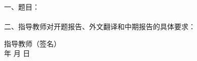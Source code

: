 
\newpage
\thispagestyle{empty}
{
\songti\sihao\bfseries
\begin{tabbing}
  \hspace{5mm} 一、题目：\underline{\makebox[12cm]{\zjutitlec}} \\
  \\
  \hspace{5mm} 二、指导教师对开题报告、外文翻译和中期报告的具体要求：
\end{tabbing}
}

\vspace{15cm}

{
\songti\xiaosi\bfseries
\begin{flushright}
  指导教师（签名） \; \underline{\hspace{4em}} \\
  \quad 年 \quad 月 \quad 日
\end{flushright}
}

